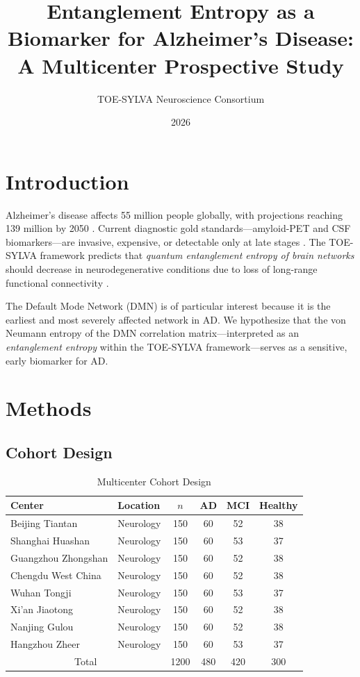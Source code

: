 \documentclass[12pt]{article}
\title{Entanglement Entropy as a Biomarker for Alzheimer's Disease:\\
A Multicenter Prospective Study}
\author{TOE-SYLVA Neuroscience Consortium}
\date{2026}
\begin{document}
\maketitle

\section{Introduction}
\label{sec:intro}

Alzheimer's disease affects 55 million people globally, with projections reaching 139 million by 2050 \cite{WHO2023}. Current diagnostic gold standards---amyloid-PET and CSF biomarkers---are invasive, expensive, or detectable only at late stages \cite{Jack2018}. The TOE-SYLVA framework \cite{TOESYLVA2026} predicts that \emph{quantum entanglement entropy of brain networks} should decrease in neurodegenerative conditions due to loss of long-range functional connectivity \cite{Buckner2008,Damoiseaux2012}.

The Default Mode Network (DMN) is of particular interest because it is the earliest and most severely affected network in AD. We hypothesize that the von Neumann entropy of the DMN correlation matrix---interpreted as an \emph{entanglement entropy} within the TOE-SYLVA framework---serves as a sensitive, early biomarker for AD.

\section{Methods}
\label{sec:methods}

\subsection{Cohort Design}

\begin{table}[ht]
\centering
\caption{Multicenter Cohort Design}
\label{tab:cohort}
\begin{tabular}{llcccc}
\toprule
Center & Location & $n$ & AD & MCI & Healthy \\
\midrule
Beijing Tiantan & Neurology & 150 & 60 & 52 & 38 \\
Shanghai Huashan & Neurology & 150 & 60 & 53 & 37 \\
Guangzhou Zhongshan & Neurology & 150 & 60 & 52 & 38 \\
Chengdu West China & Neurology & 150 & 60 & 52 & 38 \\
Wuhan Tongji & Neurology & 150 & 60 & 53 & 37 \\
Xi'an Jiaotong & Neurology & 150 & 60 & 52 & 38 \\
Nanjing Gulou & Neurology & 150 & 60 & 52 & 38 \\
Hangzhou Zheer & Neurology & 150 & 60 & 53 & 37 \\
\midrule
\multicolumn{2}{c}{Total} & 1200 & 480 & 420 & 300 \\
\bottomrule
\end{tabular}
\end{table}
\end{document}
